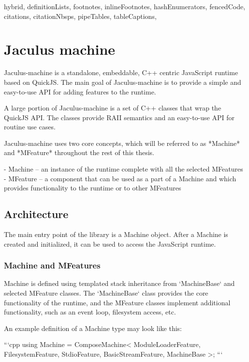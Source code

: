 \begin{markdown*}{%
  hybrid,
  definitionLists,
  footnotes,
  inlineFootnotes,
  hashEnumerators,
  fencedCode,
  citations,
  citationNbsps,
  pipeTables,
  tableCaptions,
}

\chapter{Jaculus machine}

Jaculus-machine is a standalone, embeddable, C++ centric JavaScript runtime based on QuickJS. The main goal of Jaculus-machine is to provide a simple and easy-to-use API for adding features to the runtime.

A large portion of Jaculus-machine is a set of C++ classes that wrap the QuickJS API. The classes provide RAII semantics and an easy-to-use API for routine use cases.

Jaculus-machine uses two core concepts, which will be referred to as *Machine* and *MFeature* throughout the rest of this thesis.

  - Machine -- an instance of the runtime complete with all the selected MFeatures
  - MFeature -- a component that can be used as a part of a Machine and which provides functionality to the runtime or to other MFeatures

\section{Architecture}

The main entry point of the library is a Machine object. After a Machine is created and initialized, it can be used to access the JavaScript runtime.

\subsection{Machine and MFeatures}

Machine is defined using templated stack inheritance from `MachineBase` and selected MFeature classes. The `MachineBase` class provides the core functionality of the runtime, and the MFeature classes implement additional functionality, such as an event loop, filesystem access, etc.

An example definition of a Machine type may look like this:

```cpp
using Machine = ComposeMachine<
    ModuleLoaderFeature,
    FilesystemFeature,
    StdioFeature,
    BasicStreamFeature,
    MachineBase
>;
```


\end{markdown*}
